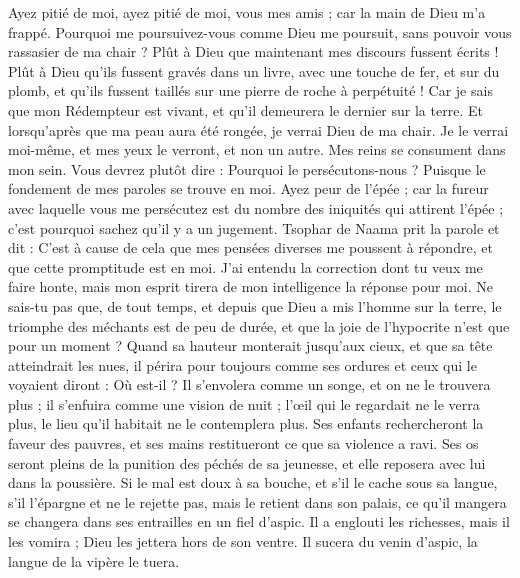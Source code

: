 \begin{multicols}{2}
Ayez pitié de moi, ayez pitié de moi, vous mes amis ; car la main de Dieu m'a frappé.
Pourquoi me poursuivez-vous comme Dieu me poursuit, sans pouvoir vous rassasier de ma chair ?
Plût à Dieu que maintenant mes discours fussent écrits ! Plût à Dieu qu'ils fussent gravés dans un livre, 
avec une touche de fer, et sur du plomb, et qu'ils fussent taillés sur une pierre de roche à perpétuité !
Car je sais que mon Rédempteur est vivant, et qu'il demeurera le dernier sur la terre.
Et lorsqu'après que ma peau aura été rongée, je verrai Dieu de ma chair.
Je le verrai moi-même, et mes yeux le verront, et non un autre. Mes reins se consument dans mon sein. 
Vous devrez plutôt dire : Pourquoi le persécutons-nous ? Puisque le fondement de mes paroles se trouve en moi.
Ayez peur de l'épée ; car la fureur avec laquelle vous me persécutez est du nombre des iniquités qui attirent l'épée ; c'est pourquoi sachez qu'il y a un jugement.
\VerseOne{}Tsophar de Naama prit la parole et dit :
C'est à cause de cela que mes pensées diverses me poussent à répondre, et que cette promptitude est en moi. 
J'ai entendu la correction dont tu veux me faire honte, mais mon esprit tirera de mon intelligence la réponse pour moi. 
Ne sais-tu pas que, de tout temps, et depuis que Dieu a mis l'homme sur la terre, 
le triomphe des méchants est de peu de durée, et que la joie de l'hypocrite n'est que pour un moment  ?
Quand sa hauteur monterait jusqu'aux cieux, et que sa tête atteindrait les nues,
il périra pour toujours comme ses ordures et ceux qui le voyaient diront : Où est-il ?
Il s'envolera comme un songe, et on ne le trouvera plus ; il s'enfuira comme une vision de nuit ;
l'œil qui le regardait ne le verra plus, le lieu qu'il habitait ne le contemplera plus.
Ses enfants rechercheront la faveur des pauvres, et ses mains restitueront ce que sa violence a ravi.
Ses os seront pleins de la punition des péchés de sa jeunesse, et elle reposera avec lui dans la poussière.
Si le mal est doux à sa bouche, et s'il le cache sous sa langue,
s'il l'épargne et ne le rejette pas, mais le retient dans son palais, 
ce qu'il mangera se changera dans ses entrailles en un fiel d'aspic.
Il a englouti les richesses, mais il les vomira ; Dieu les jettera hors de son ventre.
Il sucera du venin d'aspic, la langue de la vipère le tuera.

\end{multicols}
